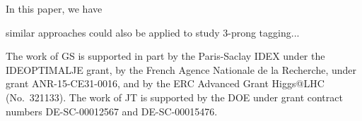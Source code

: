 \documentclass[11pt,letterpaper]{article}
\begin{document}
In this paper, we have

similar approaches could also be applied to study $3$-prong tagging...


\begin{acknowledgments}


The work of GS is supported in part by the Paris-Saclay IDEX under the
IDEOPTIMALJE grant, by the French Agence Nationale de la Recherche,
under grant ANR-15-CE31-0016, and by the ERC Advanced Grant Higgs@LHC
(No.\ 321133).
%
The work of JT is supported by the DOE under grant contract numbers DE-SC-00012567 and DE-SC-00015476.


\end{acknowledgments}



\appendix

%
%
%
%
%
%

%
%
%
%
%
%
%
%
%
\end{document}
